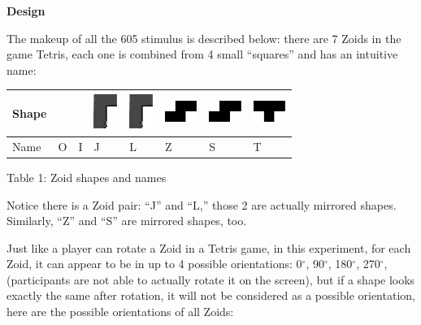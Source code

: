 \documentclass{article}
\begin{document}
	\noindent \textbf{Design}
	
	\noindent The makeup of all the 605 stimulus is described below: there are 7 Zoids in the game Tetris, each one is combined from 4 small ``squares'' and has an intuitive name: 
	
	\begin{tabular}{|p{0.5in}|p{0.5in}|p{0.5in}|p{0.5in}|p{0.5in}|p{0.5in}|p{0.5in}|p{0.5in}|} \hline 
		Shape &  &  & \includegraphics*[width=0.31in, height=0.47in, keepaspectratio=false]{image1} & \includegraphics*[width=0.31in, height=0.47in, keepaspectratio=false]{image2} & \includegraphics*[width=0.42in, height=0.28in, keepaspectratio=false]{image3} & \includegraphics*[width=0.42in, height=0.28in, keepaspectratio=false]{image4} & \includegraphics*[width=0.42in, height=0.28in, keepaspectratio=false]{image5} \\ \hline 
		Name & O & I & J & L & Z & S & T \\ \hline 
	\end{tabular}
	
	Table 1: Zoid shapes and names
	
	\noindent Notice there is a Zoid pair: ``J'' and ``L,'' those 2 are actually mirrored shapes. Similarly, ``Z'' and ``S'' are mirrored shapes, too. 
	
	\noindent Just like a player can rotate a Zoid in a Tetris game, in this experiment, for each Zoid, it can appear to be in up to 4 possible orientations: 0$\mathrm{{}^\circ}$, 90$\mathrm{{}^\circ}$, 180$\mathrm{{}^\circ}$, 270$\mathrm{{}^\circ}$, (participants are not able to actually rotate it on the screen), but if a shape looks exactly the same after rotation, it will not be considered as a possible orientation, here are the possible orientations of all Zoids:
	
\end{document}
